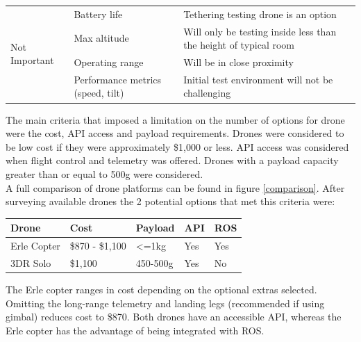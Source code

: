 \documentclass[capstone_report.tex]{subfiles}
\begin{document}
\begin{table}[H]
\begin{tabular}{lp{6cm}p{8cm}}
\midrule
\multirow{5}{*}{Not Important} & Battery life                               & Tethering testing drone is an option                                                                          \\
                               & Max altitude                               & Will only be testing inside less than the height of typical room                                              \\
                               & Operating range                            &   Will be in close proximity                                                                                                            \\
                               & Performance metrics (speed, tilt)          & Initial test environment will not be challenging                                                              \\ \midrule
\end{tabular}
\end{table}

The main criteria that imposed a limitation on the number of options for drone were the cost, API access and payload requirements.  Drones were considered to be low cost if they were approximately \$1,000 or less.  API access was considered when flight control and telemetry was offered.  Drones with a payload capacity greater than or equal to 500g were considered.\\

A full comparison of drone platforms can be found in figure \ref{comparison}.  After surveying available drones the 2 potential options that met this criteria were:

\begin{table}[H]
\centering
\label{eligible_drones}
\begin{tabular}{@{}lllll@{}}
\toprule
Drone       & Cost          & Payload       & API & ROS \\ \midrule
Erle Copter & \$870 - \$1,100 & \textless=1kg & Yes & Yes \\
3DR Solo    & \$1,100       & 450-500g      & Yes & No  \\ \bottomrule
\end{tabular}
\end{table}

The Erle copter ranges in cost depending on the optional extras selected.  Omitting the long-range telemetry and landing legs (recommended if using gimbal) reduces cost to \$870.  Both drones have an accessible API, whereas the Erle copter has the advantage of being integrated with ROS.\\
\end{document}
